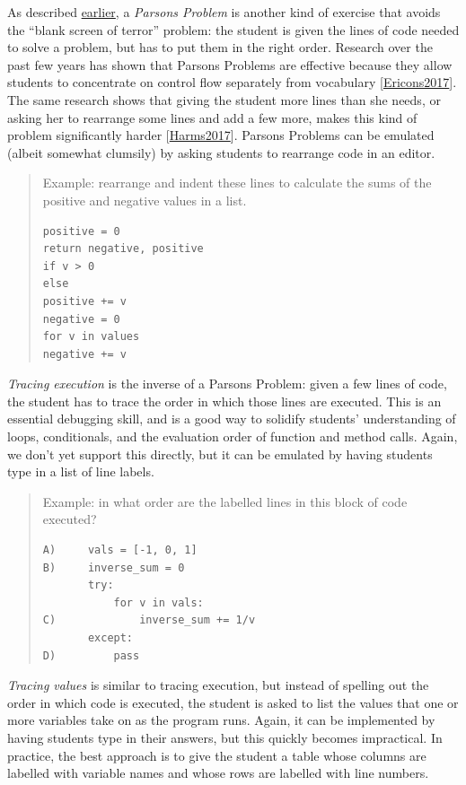 \documentclass[10pt,statementpaper]{memoir}
\begin{document}
As described \href{load.html}{earlier}, a \emph{Parsons Problem} is
another kind of exercise that avoids the ``blank screen of terror''
problem: the student is given the lines of code needed to solve a
problem, but has to put them in the right order. Research over the past
few years has shown that Parsons Problems are effective because they
allow students to concentrate on control flow separately from vocabulary
{[}\href{biblio.html\#ericson-parsons}{Ericons2017}{]}. The same
research shows that giving the student more lines than she needs, or
asking her to rearrange some lines and add a few more, makes this kind
of problem significantly harder
{[}\href{biblio.html\#harms-parsons}{Harms2017}{]}. Parsons Problems can
be emulated (albeit somewhat clumsily) by asking students to rearrange
code in an editor.

\begin{quote}
Example: rearrange and indent these lines to calculate the sums of the
positive and negative values in a list.

\begin{verbatim}
positive = 0
return negative, positive
if v > 0
else
positive += v
negative = 0
for v in values
negative += v
\end{verbatim}
\end{quote}

\emph{Tracing execution} is the inverse of a Parsons Problem: given a
few lines of code, the student has to trace the order in which those
lines are executed. This is an essential debugging skill, and is a good
way to solidify students' understanding of loops, conditionals, and the
evaluation order of function and method calls. Again, we don't yet
support this directly, but it can be emulated by having students type in
a list of line labels.

\begin{quote}
Example: in what order are the labelled lines in this block of code
executed?

\begin{verbatim}
A)     vals = [-1, 0, 1]
B)     inverse_sum = 0
       try:
           for v in vals:
C)             inverse_sum += 1/v
       except:
D)         pass
\end{verbatim}
\end{quote}

\emph{Tracing values} is similar to tracing execution, but instead of
spelling out the order in which code is executed, the student is asked
to list the values that one or more variables take on as the program
runs. Again, it can be implemented by having students type in their
answers, but this quickly becomes impractical. In practice, the best
approach is to give the student a table whose columns are labelled with
variable names and whose rows are labelled with line numbers.
\end{document}
